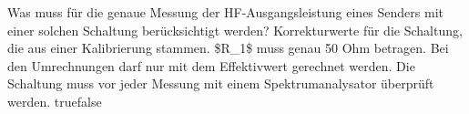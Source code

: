     {Was muss für die genaue Messung der HF-Ausgangsleistung eines Senders mit einer solchen Schaltung berücksichtigt werden?}
    {Korrekturwerte für die Schaltung, die aus einer Kalibrierung stammen.}
    {\$R\_1\$ muss genau 50 Ohm betragen.}
    {Bei den Umrechnungen darf nur mit dem Effektivwert gerechnet werden.}
    {Die Schaltung muss vor jeder Messung mit einem Spektrumanalysator überprüft werden.}
    {true}{false}